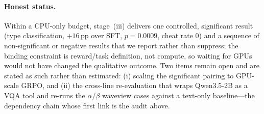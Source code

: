\paragraph{Honest status.}
Within a CPU-only budget, stage~(iii) delivers one controlled, significant result (type classification, $+16$\,pp over SFT, $p{=}0.0009$, cheat rate $0$) and a sequence of non-significant or negative results that we report rather than suppress; the binding constraint is reward/task definition, not compute, so waiting for GPUs would not have changed the qualitative outcome. Two items remain open and are stated as such rather than estimated: (i) scaling the significant pairing to GPU-scale GRPO, and (ii) the cross-line re-evaluation that wraps Qwen3.5-2B as a VQA tool and re-runs the $\alpha$/$\beta$ waveview cases against a text-only baseline---the dependency chain whose first link is the audit above.
